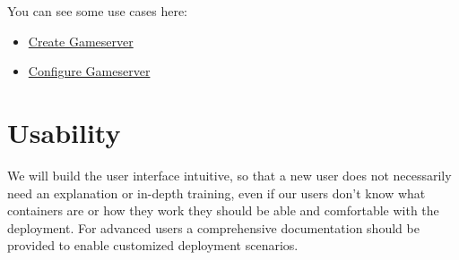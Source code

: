 \documentclass[a4paper,12pt,chapterprefix=false,bibliography=totoc,listof=totoc,]{scrreprt}
\begin{document}
You can see some use cases here:
\begin{itemize}
	\item \href{https://gamebase.pages.gitlab.tandashi.de/documentation/UCCreateGameServer.pdf}{Create Gameserver}
	\item \href{https://gamebase.pages.gitlab.tandashi.de/documentation/UCConfigureGameServer.pdf}{Configure Gameserver}
\end{itemize}

\section{Usability}
We will build the user interface intuitive, so that a new user does not necessarily need an explanation or in-depth training, even if our users don't know what containers are or how they work they should be able and comfortable with the deployment. For advanced users a comprehensive documentation should be provided to enable customized deployment scenarios.
\end{document}
